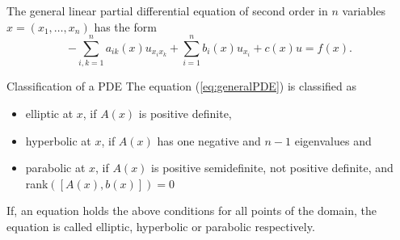 
\begin{defn}

	The general linear partial differential equation of second order in $n$ variables $x=(x_1,\ldots,x_n)$ has the form
	\begin{equation}
		-\sum_{ i, k = 1 }^n a_{ ik } (x) u_{ x_i x_k } + \sum_{ i = 1 }^n b_i (x) u_{ x_i } + c (x) u = f (x).
		\label{eq:generalPDE}
	\end{equation}
\end{defn}

\begin{defn}{Classification of a PDE}
	The equation (\ref{eq:generalPDE}) is classified as
		\begin{itemize}
			\item elliptic at $x$, if $A(x)$ is positive definite,
			\item hyperbolic at $x$, if $A(x)$ has one negative and $n-1$ eigenvalues and
			\item parabolic at $x$, if $A(x)$ is positive semidefinite, not positive definite, and rank$([A(x), b(x)])=0$  
		\end{itemize}
	
	If, an equation holds the above conditions for all points of the domain, the equation is called elliptic, hyperbolic or parabolic respectively. 
	\end{defn}